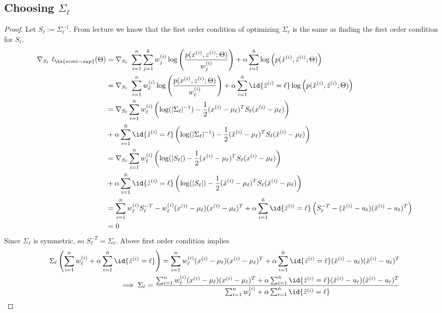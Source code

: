\documentclass[11pt]{article}
\newcommand{\upi}[0]{^{(i)}}
\begin{document}
	\subsection{Choosing $\Sigma_\ell$}
	\begin{proof}
		Let $S_\ell := \Sigma_\ell^{-1}$. From lecture we know that the first order condition of optimizing $\Sigma_\ell$ is the same as finding the first order condition for $S_\ell$.
		\begin{align}
			\nabla_{S_\ell}\ \ell_{\tx{semi-sup}}(\Theta) &= \nabla_{S_\ell}\ \sum_{i=1}^n \sum_{j=1}^k w\upi_j \log \left( \frac{p(x\upi, z\upi; \Theta)}{w\upi_j} \right) + \alpha \sum_{i=1}^{\tilde{n}} \log \left(p(\tilde{x}\upi, \tilde{z}\upi; \Theta)
			\right) \\
			&= \nabla_{S_\ell}\ \sum_{i=1}^n w\upi_\ell \log \left( \frac{p(x\upi, z\upi; \Theta)}{w\upi_\ell} \right) + \alpha \sum_{i=1}^{\tilde{n}} \id{\tilde{z}\upi = \ell} \log \left(p(\tilde{x}\upi, \tilde{z}\upi; \Theta) \right) \\
			&= \nabla_{S_\ell} \sum_{i=1}^n w_\ell\upi \left(
			\log(|\Sigma_\ell|^{-1}) - \frac{1}{2} (x\upi - \mu_\ell)^T S_\ell (x\upi - \mu_\ell) \right) \\
			&+ \alpha \sum_{i=1}^{\tilde{n}} \id{\tilde{z}\upi = \ell} \left (
				\log(|\Sigma_\ell|^{-1}) - \frac{1}{2} (\tilde{x}\upi - \mu_\ell)^T S_\ell (\tilde{x}\upi - \mu_\ell)
			\right) \\
			&= \nabla_{S_\ell} \sum_{i=1}^n w_\ell\upi \left(
			\log(|S_\ell|) - \frac{1}{2} (x\upi - \mu_\ell)^T S_\ell (x\upi - \mu_\ell) \right) \\
			&+ \alpha \sum_{i=1}^{\tilde{n}} \id{\tilde{z}\upi = \ell} \left (
				\log(|S_\ell|) - \frac{1}{2} (\tilde{x}\upi - \mu_\ell)^T S_\ell (\tilde{x}\upi - \mu_\ell)
			\right) \\
			&= \sum_{i=1}^n w_\ell\upi S_\ell^{-T} - w_\ell\upi (x\upi - \mu_\ell) (x\upi - \mu_\ell)^T + \alpha \sum_{i=1}^{\tilde{n}} \id{\tilde{z}\upi = \ell} \left(
			S_\ell^{-T} - (\tilde{x}\upi - u_\ell) (\tilde{x}\upi - u_\ell)^T
			\right) \\
			&= 0
		\end{align}
		Since $\Sigma_\ell$ is symmetric, so $S^{-T}_\ell = \Sigma_\ell$. Above first order condition implies
		\begin{align}
			\Sigma_\ell \left (\sum_{i=1}^n w_\ell\upi + \alpha \sum_{i=1}^{\tilde{n}} \id{\tilde{z}\upi = \ell} \right) = \sum_{i=1}^n w_\ell\upi (x\upi - \mu_\ell) (x\upi - \mu_\ell)^T + \alpha \sum_{i=1}^{\tilde{n}} \id{\tilde{z}\upi = \ell} (\tilde{x}\upi - u_\ell) (\tilde{x}\upi - u_\ell)^T \\
			\implies \Sigma_\ell = \frac{\sum_{i=1}^n w_\ell\upi (x\upi - \mu_\ell) (x\upi - \mu_\ell)^T + \alpha \sum_{i=1}^{\tilde{n}} \id{\tilde{z}\upi = \ell} (\tilde{x}\upi - u_\ell) (\tilde{x}\upi - u_\ell)^T}{\sum_{i=1}^n w_\ell\upi + \alpha \sum_{i=1}^{\tilde{n}} \id{\tilde{z}\upi = \ell}}
		\end{align}
	\end{proof}
\end{document}
